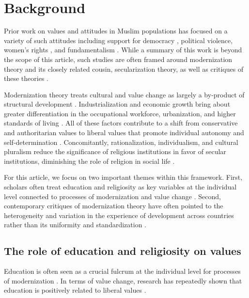 \documentclass[10pt,letterpaper]{article}
\begin{document}
\section*{Background}

Prior work on values and attitudes in Muslim populations has focused on
a variety of such attitudes including support for democracy
\cite{jamal_attitudes_2008, ciftci_modernization_2010, ciftci_secularislamist_2013},
political violence\cite{mousseau_urban_2011, berger_foreign_2014},
women's rights \cite{inglehart_true_2003}, and fundamentalism
\cite{moaddel_religious_2018}. While a summary of this work is beyond
the scope of this article, such studies are often framed around
modernization theory and its closely related cousin, secularization
theory, as well as critiques of these theories
\cite{jamal_reassessing_2006, moaddel_introduction_2007, ciftci_modernization_2010}.

Modernization theory treats cultural and value change as largely a
by-product of structural development
\cite{lerner_passing_1958, parsons_social_1964, inkeles_becoming_1974}.
Industrialization and economic growth bring about greater
differentiation in the occupational workforce, urbanization, and higher
standards of living \cite{rostow_stages_1960}. All of these factors
contribute to a shift from conservative and authoritarian values to
liberal values that promote individual autonomy and self-determination
\cite{parsons_social_1964}. Concomitantly, rationalization,
individualism, and cultural pluralism reduce the significance of
religious institutions in favor of secular institutions, diminishing the
role of religion in social life
\cite{wilson_religion_1966, bruce_secularization_2011, emerson_rise_2006}.

For this article, we focus on two important themes within this
framework. First, scholars often treat education and religiosity as key
variables at the individual level connected to processes of
modernization and value change \cite{scheepers_education_2002}. Second,
contemporary critiques of modernization theory have often pointed to the
heterogeneity and variation in the experience of development across
countries rather than its uniformity and standardization
\cite{smith_future_2008}.

\subsection*{The role of education and religiosity on values}

Education is often seen as a crucial fulcrum at the individual level for
processes of modernization
\cite{meyer_effects_1977, chabbott_development_2000, depaepe_educationalization_2008}.
In terms of value change, research has repeatedly shown that education
is positively related to liberal values
\cite{hyman_education_1979, bobo_education_1989, weakliem_effects_2002, kingston_why_2003}.
\end{document}
